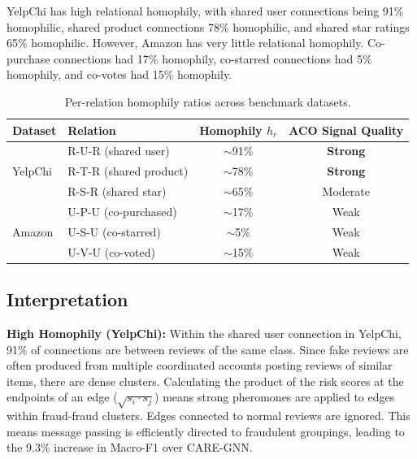 YelpChi has high relational homophily, with shared user connections being 91\% homophilic, shared product connections 78\% homophilic, and shared star ratings 65\% homophilic. However, Amazon has very little relational homophily. Co-purchase connections had 17\% homophily, co-starred connections had 5\% homophily, and co-votes had 15\% homophily.

\begin{table}[htbp]
\centering
\small
\caption[Per-relation homophily ratios]{Per-relation homophily ratios across benchmark datasets.}
\label{tab:homophily_ratios}
\begin{tabular*}{\textwidth}{@{\extracolsep{\fill}}llcc}
\toprule
\textbf{Dataset} & \textbf{Relation} & \textbf{Homophily $h_r$} & \textbf{ACO Signal Quality} \\
\midrule
\multirow{3}{*}{YelpChi} & R-U-R (shared user)     & $\sim$91\% & \textcolor{green!60!black}{\textbf{Strong}} \\
                          & R-T-R (shared product)  & $\sim$78\% & \textcolor{green!60!black}{\textbf{Strong}} \\
                          & R-S-R (shared star)     & $\sim$65\% & Moderate \\
\midrule
\multirow{3}{*}{Amazon}  & U-P-U (co-purchased)    & $\sim$17\% & \textcolor{red!70!black}{Weak} \\
                          & U-S-U (co-starred)      & $\sim$5\%  & \textcolor{red!70!black}{Weak} \\
                          & U-V-U (co-voted)        & $\sim$15\% & \textcolor{red!70!black}{Weak} \\
\bottomrule
\end{tabular*}
\end{table}

\subsection{Interpretation}

\textbf{High Homophily (YelpChi):} Within the shared user connection in YelpChi, 91\% of connections are between reviews of the same class. Since fake reviews are often produced from multiple coordinated accounts posting reviews of similar items, there are dense clusters. Calculating the product of the risk scores at the endpoints of an edge ($\sqrt{s_i \cdot s_j}$) means strong pheromones are applied to edges within fraud-fraud clusters. Edges connected to normal reviews are ignored. This means message passing is efficiently directed to fraudulent groupings, leading to the 9.3\% increase in Macro-F1 over CARE-GNN.

